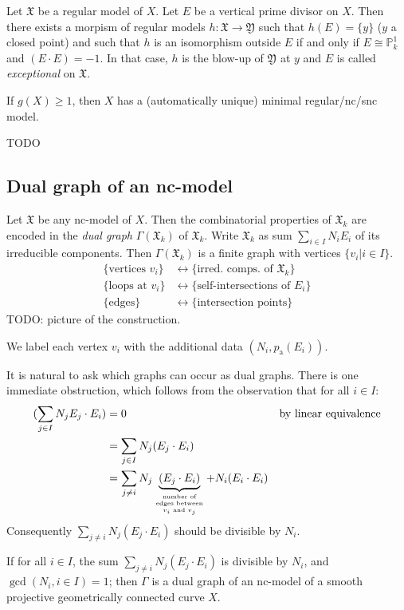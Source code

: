 \begin{theorem}
	Let $\mathfrak{X}$ be a regular model of $X$. Let $E$ be a vertical
	prime divisor on $X$. Then there exists a morpism of regular models $h
	\colon \mathfrak{X} \to \mathfrak{Y}$ such that $h(E) = \{y\}$ ($y$ a
	closed point) and such that $h$ is an isomorphism outside $E$ if and
	only if $E \cong \mathbb{P}^{1}_{k}$ and $(E \cdot E) = -1$. In that
	case, $h$ is the blow-up of $\mathfrak{Y}$ at $y$ and $E$ is called
	\emph{exceptional} on $\mathfrak{X}$.
\end{theorem}

\begin{exercise}
	If $g(X) \ge 1$, then $X$ has a (automatically unique) minimal
	regular/nc/snc model.
	\begin{solution}
		TODO
	\end{solution}
\end{exercise}

\subsection{Dual graph of an nc-model}

Let $\mathfrak{X}$ be any nc-model of $X$. Then the combinatorial properties of
$\mathfrak{X}_{k}$ are encoded in the \emph{dual graph}
$\Gamma(\mathfrak{X}_{k})$ of $\mathfrak{X}_{k}$. Write $\mathfrak{X}_{k}$ as
sum $\sum_{i \in I}N_{i}E_{i}$ of its irreducible components. Then
$\Gamma(\mathfrak{X}_{k})$ is a finite graph with vertices $\{ v_{i} | i \in I
\}$.
\begin{align*}
	\{\text{vertices } v_{i}\} &\longleftrightarrow \{ \text{irred. comps. of $\mathfrak{X}_{k}$} \} \\
	\{\text{loops at } v_{i}\} &\longleftrightarrow \{ \text{self-intersections of $E_{i}$} \} \\
	\{\text{edges} \} &\longleftrightarrow \{ \text{intersection points} \}
\end{align*}
TODO: picture of the construction.

We label each vertex $v_{i}$ with the additional data $(N_{i}, p_{\textrm{a}}(E_{i}))$.

It is natural to ask which graphs can occur as dual graphs. There is one
immediate obstruction, which follows from the observation that for all $i \in
I$:
\begin{align*}
	(\sum_{j \in I} N_{j}E_{j} \cdot E_{i}) &= 0 &&\text{by linear equivalence} \\
	&= \sum_{j \in I} N_{j} (E_{j} \cdot E_{i}) \\
	&= \sum_{j \ne i} N_{j} \underbrace{(E_{j} \cdot E_{i})}_{\parbox{4.5em}{\tiny \centering number of edges between $v_{i}$ and $v_{j}$}} + N_{i}(E_{i} \cdot E_{i})
\end{align*}
Consequently $\sum_{j \ne i} N_{j} (E_{j} \cdot E_{i})$ should be divisible by $N_{i}$.
\begin{theorem}[Winters]
	If for all $i \in I$, the sum $\sum_{j \ne i} N_{j} (E_{j} \cdot E_{i})$ is divisible by $N_{i}$, and $\gcd(N_{i}, i \in I) = 1$; then $\Gamma$ is a dual graph of an nc-model of a smooth projective geometrically connected curve $X$.
\end{theorem}

